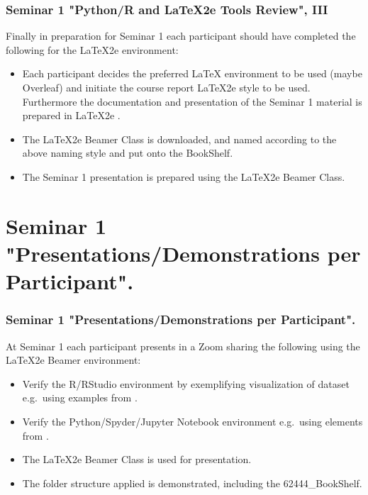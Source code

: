 \documentclass{beamer}
\begin{document}
\begin{frame}[fragile, label={ToolReview}]
\frametitle{Seminar 1 "Python/R and \LaTeX2e \hspace*{0.5mm} Tools  Review", III}
\scriptsize{

Finally in preparation for Seminar 1 each participant should have completed the following for the \LaTeX2e \hspace*{0.2mm} environment:
\begin{itemize}
\item Each participant decides the preferred \LaTeX \hspace*{0.5mm} environment to be used (maybe Overleaf) and initiate the course report \LaTeX2e \hspace*{0.5mm} style
to be used. Furthermore the documentation and presentation of the Seminar 1 material is prepared in \LaTeX2e .
\item The \LaTeX2e \hspace*{0.5mm} Beamer Class \cite{Tantau2022} is downloaded, and named according to the above naming style and put onto the BookShelf.
\item The Seminar 1 presentation is prepared using the \LaTeX2e Beamer Class.

\end{itemize}

}
\end{frame}
\section{Seminar 1 "Presentations/Demonstrations  per Participant".}
\begin{frame}[fragile, label={ToolReview}]
\frametitle{Seminar 1 "Presentations/Demonstrations  per Participant".}
\scriptsize{

At Seminar 1 each participant presents in a Zoom sharing the following using the \LaTeX2e \hspace*{0.5mm} Beamer environment:
\begin{itemize}
\item Verify the R/RStudio environment by exemplifying visualization of dataset e.g.\ using examples from \cite{Kabacoff2020}.    
\item Verify the Python/Spyder/Jupyter Notebook environment e.g.\ using elements from \cite{VanderPlas2016}. 
\item The \LaTeX2e \hspace*{0.5mm} Beamer Class \cite{Tantau2022} is used for presentation.
\item The folder structure applied is demonstrated, including the 62444\_BookShelf.

\end{itemize}

}
\end{frame}
\end{document}
